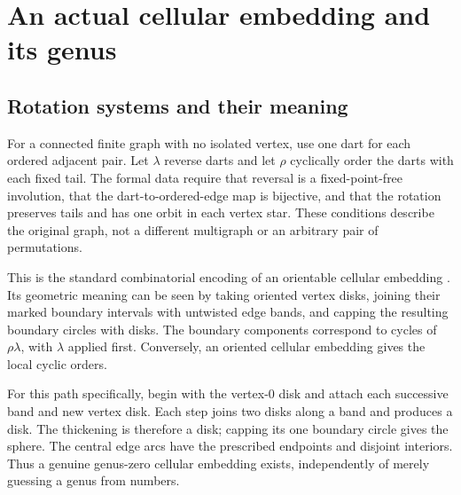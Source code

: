 \documentclass[11pt]{article}
\begin{document}
\newpage
\section{An actual cellular embedding and its genus}
\subsection{Rotation systems and their meaning}
For a connected finite graph with no isolated vertex, use one dart for each
ordered adjacent pair. Let $\lambda$ reverse darts and let $\rho$ cyclically
order the darts with each fixed tail. The formal data require that reversal
is a fixed-point-free involution, that the dart-to-ordered-edge map is
bijective, and that the rotation preserves tails and has one orbit in each
vertex star. These conditions describe the original graph, not a different
multigraph or an arbitrary pair of permutations.

This is the standard combinatorial encoding of an orientable cellular
embedding \cite[Section 2, Proposition 2.2]{rotation}. Its geometric meaning
can be seen by taking oriented vertex disks, joining their marked boundary
intervals with untwisted edge bands, and capping the resulting boundary
circles with disks. The boundary components correspond to cycles of
$\rho\lambda$, with $\lambda$ applied first. Conversely, an oriented
cellular embedding gives the local cyclic orders.

For this path specifically, begin with the vertex-$0$ disk and attach each
successive band and new vertex disk. Each step joins two disks along a band
and produces a disk. The thickening is therefore a disk; capping its one
boundary circle gives the sphere. The central edge arcs have the prescribed
endpoints and disjoint interiors. Thus a genuine genus-zero cellular
embedding exists, independently of merely guessing a genus from numbers.
\end{document}
